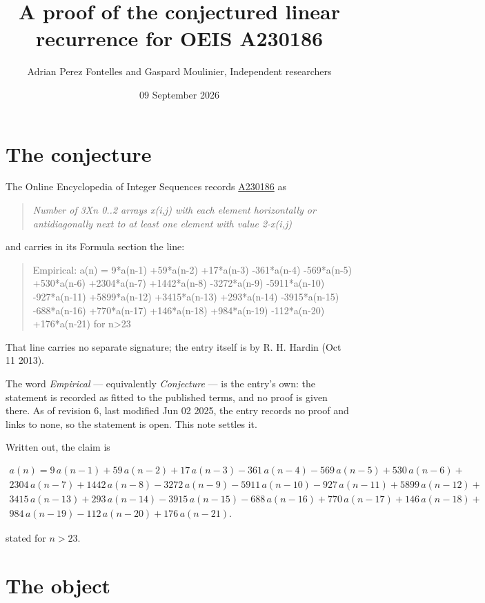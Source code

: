 \documentclass[11pt]{article}
\title{A proof of the conjectured linear recurrence for OEIS A230186}
\author{Adrian Perez Fontelles and Gaspard Moulinier, Independent researchers}
\date{09 September 2026}
\theoremstyle{definition}
\begin{document}
\maketitle
\section{The conjecture}

The Online Encyclopedia of Integer Sequences records \href{https://oeis.org/A230186}{A230186} as

\begin{quote}\itshape Number of 3Xn 0..2 arrays x(i,j) with each element horizontally or antidiagonally next to at least one element with value 2-x(i,j)\end{quote}

and carries in its Formula section the line:

\begin{quote}\ttfamily Empirical: a(n) = 9*a(n-1) +59*a(n-2) +17*a(n-3) -361*a(n-4) -569*a(n-5) +530*a(n-6) +2304*a(n-7) +1442*a(n-8) -3272*a(n-9) -5911*a(n-10) -927*a(n-11) +5899*a(n-12) +3415*a(n-13) +293*a(n-14) -3915*a(n-15) -688*a(n-16) +770*a(n-17) +146*a(n-18) +984*a(n-19) -112*a(n-20) +176*a(n-21) for n>23\end{quote}

That line carries no separate signature; the entry itself is by R. H. Hardin (Oct 11 2013).

The word {\itshape Empirical} --- equivalently {\itshape Conjecture} --- is the entry's own: the statement is recorded as fitted to the published terms, and no proof is given there. As of revision 6, last modified Jun 02 2025, the entry records no proof and links to none, so the statement is open. This note settles it.

Written out, the claim is

\begin{multline*} a(n) = 9\,a(n-1) + 59\,a(n-2) + 17\,a(n-3) - 361\,a(n-4) - 569\,a(n-5) + 530\,a(n-6) + \\ 2304\,a(n-7) + 1442\,a(n-8) - 3272\,a(n-9) - 5911\,a(n-10) - 927\,a(n-11) + 5899\,a(n-12) + \\ 3415\,a(n-13) + 293\,a(n-14) - 3915\,a(n-15) - 688\,a(n-16) + 770\,a(n-17) + 146\,a(n-18) + \\ 984\,a(n-19) - 112\,a(n-20) + 176\,a(n-21). \end{multline*}

stated for $n > 23$.

\section{The object}
\end{document}
